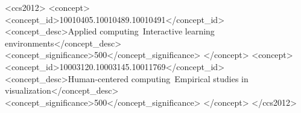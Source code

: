 \documentclass[manuscript,screen,review]{acmart}
\begin{document}
\begin{CCSXML}
<ccs2012>
   <concept>
       <concept_id>10010405.10010489.10010491</concept_id>
       <concept_desc>Applied computing~Interactive learning environments</concept_desc>
       <concept_significance>500</concept_significance>
       </concept>
   <concept>
       <concept_id>10003120.10003145.10011769</concept_id>
       <concept_desc>Human-centered computing~Empirical studies in visualization</concept_desc>
       <concept_significance>500</concept_significance>
       </concept>
 </ccs2012>
\end{CCSXML}






\maketitle









\nocite{*}


\end{document}
